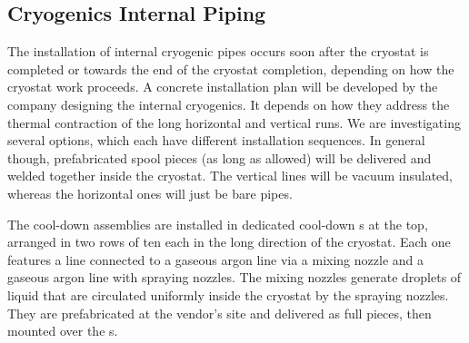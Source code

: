 
\subsection{Cryogenics Internal Piping}
\label{sec:fdgen-slow-cryo-install-pipes}


The installation of internal cryogenic pipes occurs soon after the cryostat is completed or towards the end of the cryostat completion, depending on how the cryostat work proceeds. A concrete installation plan will be developed by the company designing the internal cryogenics. It depends on how they address the thermal contraction of the long horizontal and vertical runs. We are investigating several options, which each have different installation sequences. In general though, prefabricated spool pieces (as long as allowed) will be delivered and welded together inside the cryostat. The vertical lines will be vacuum insulated, whereas the horizontal ones will just be bare pipes.

The cool-down assemblies are installed in dedicated cool-down \fdth{}s at the top, arranged in
two rows of ten each in the long direction of the cryostat. Each one features a \lar line connected to a gaseous argon line via a mixing nozzle and a gaseous argon line with spraying nozzles. The mixing nozzles generate droplets of liquid that are circulated uniformly inside the cryostat by the spraying nozzles. They are prefabricated at the vendor's site and delivered as full pieces, %
then mounted over the \fdth{}s.

